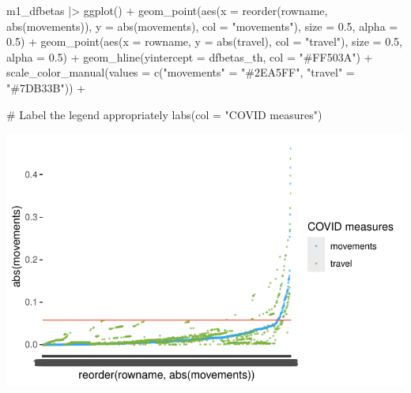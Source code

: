 \documentclass[
  letterpaper,
]{krantz}
\makeatletter
\newenvironment{Shaded}{\begin{snugshade}}{\end{snugshade}}
\newcommand{\AttributeTok}[1]{\textcolor[rgb]{0.40,0.45,0.13}{#1}}
\newcommand{\CommentTok}[1]{\textcolor[rgb]{0.37,0.37,0.37}{#1}}
\newcommand{\FloatTok}[1]{\textcolor[rgb]{0.68,0.00,0.00}{#1}}
\newcommand{\FunctionTok}[1]{\textcolor[rgb]{0.28,0.35,0.67}{#1}}
\newcommand{\NormalTok}[1]{\textcolor[rgb]{0.00,0.23,0.31}{#1}}
\newcommand{\OtherTok}[1]{\textcolor[rgb]{0.00,0.23,0.31}{#1}}
\newcommand{\SpecialCharTok}[1]{\textcolor[rgb]{0.37,0.37,0.37}{#1}}
\newcommand{\StringTok}[1]{\textcolor[rgb]{0.13,0.47,0.30}{#1}}
\newenvironment{kframe}{%
\medskip{}
\setlength{\fboxsep}{.8em}
 \def\at@end@of@kframe{}%
 \ifinner\ifhmode%
  \def\at@end@of@kframe{\end{minipage}}%
  \begin{minipage}{\columnwidth}%
 \fi\fi%
 \def\FrameCommand##1{\hskip\@totalleftmargin \hskip-\fboxsep
 \colorbox{shadecolor}{##1}\hskip-\fboxsep
     \hskip-\linewidth \hskip-\@totalleftmargin \hskip\columnwidth}%
 \MakeFramed {\advance\hsize-\width
   \@totalleftmargin\z@ \linewidth\hsize
   \@setminipage}}%
 {\par\unskip\endMakeFramed%
 \at@end@of@kframe}
\renewenvironment{Shaded}{\begin{kframe}}{\end{kframe}}
\makeatother
\begin{document}
\begin{Shaded}
\begin{Highlighting}[]
\NormalTok{m1\_dfbetas }\SpecialCharTok{|\textgreater{}}
  \FunctionTok{ggplot}\NormalTok{() }\SpecialCharTok{+}
  \FunctionTok{geom\_point}\NormalTok{(}\FunctionTok{aes}\NormalTok{(}\AttributeTok{x =} \FunctionTok{reorder}\NormalTok{(rowname, }\FunctionTok{abs}\NormalTok{(movements)),}
                 \AttributeTok{y =} \FunctionTok{abs}\NormalTok{(movements),}
                 \AttributeTok{col =} \StringTok{"movements"}\NormalTok{),}
             \AttributeTok{size =} \FloatTok{0.5}\NormalTok{,}
             \AttributeTok{alpha =} \FloatTok{0.5}\NormalTok{) }\SpecialCharTok{+}
  \FunctionTok{geom\_point}\NormalTok{(}\FunctionTok{aes}\NormalTok{(}\AttributeTok{x =}\NormalTok{ rowname,}
                 \AttributeTok{y =} \FunctionTok{abs}\NormalTok{(travel),}
                 \AttributeTok{col =} \StringTok{"travel"}\NormalTok{),}
             \AttributeTok{size =} \FloatTok{0.5}\NormalTok{,}
             \AttributeTok{alpha =} \FloatTok{0.5}\NormalTok{) }\SpecialCharTok{+}
  \FunctionTok{geom\_hline}\NormalTok{(}\AttributeTok{yintercept =}\NormalTok{ dfbetas\_th, }\AttributeTok{col =} \StringTok{"\#FF503A"}\NormalTok{) }\SpecialCharTok{+}
  \FunctionTok{scale\_color\_manual}\NormalTok{(}\AttributeTok{values =} \FunctionTok{c}\NormalTok{(}\StringTok{"movements"} \OtherTok{=} \StringTok{"\#2EA5FF"}\NormalTok{,}
                                \StringTok{"travel"} \OtherTok{=} \StringTok{"\#7DB33B"}\NormalTok{)) }\SpecialCharTok{+}

  \CommentTok{\# Label the legend appropriately}
  \FunctionTok{labs}\NormalTok{(}\AttributeTok{col =} \StringTok{"COVID measures"}\NormalTok{)}
\end{Highlighting}
\end{Shaded}

\includegraphics{13_regressions_files/figure-pdf/dfbetas-plot-outliers-alternative-1.pdf}
\end{document}

